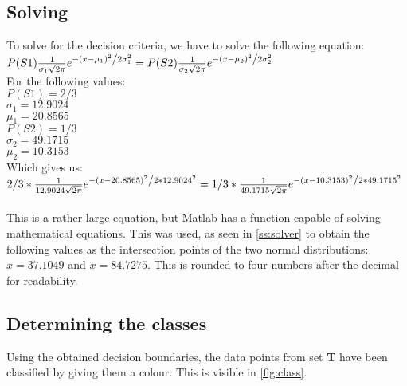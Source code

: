 \documentclass[10pt,a4paper]{article}
\begin{document}
\subsection{Solving}\label{ss:solving}
To solve for the decision criteria, we have to solve the following equation:\\
$
P(S1) \frac{1}{{\sigma_1 \sqrt {2\pi } }}e^{{{ - \left( {x - \mu_1 } \right)^2 } \mathord{\left/ {\vphantom {{ - \left( {x - \mu_1 } \right)^2 } {2\sigma_1 ^2 }}} \right. \kern-\nulldelimiterspace} {2\sigma_1 ^2 }}} = P(S2) \frac{1}{{\sigma_2 \sqrt {2\pi } }}e^{{{ - \left( {x - \mu_2 } \right)^2 } \mathord{\left/ {\vphantom {{ - \left( {x - \mu_2 } \right)^2 } {2\sigma_2 ^2 }}} \right. \kern-\nulldelimiterspace} {2\sigma_2 ^2 }}}
$\\
For the following values:\\
$P(S1) = 2/3$\\
$\sigma_1 = 12.9024$\\
$\mu_1 = 20.8565$\\
$P(S2) = 1/3$\\
$\sigma_2 = 49.1715$\\
$\mu_2 = 10.3153$\\
Which gives us:\\
$
2/3 * \frac{1}{{12.9024 \sqrt {2\pi } }}e^{{{ - \left( {x - 20.8565 } \right)^2 } \mathord{\left/ {\vphantom {{ - \left( {x - 20.85651 } \right)^2 } {2 * 12.9024 ^2 }}} \right. \kern-\nulldelimiterspace} {2 * 12.9024 ^2 }}} = 1/3 * \frac{1}{{49.1715 \sqrt {2\pi } }}e^{{{ - \left( {x - 10.3153 } \right)^2 } \mathord{\left/ {\vphantom {{ - \left( {x - 10.3153 } \right)^2 } {2 * 49.1715 ^2 }}} \right. \kern-\nulldelimiterspace} {2 * 49.1715 ^2 }}}
$\\
\\
This is a rather large equation, but Matlab has a function capable of solving mathematical equations. This was used, as seen in \autoref{ss:solver} to obtain the following values as the intersection points of the two normal distributions: $ x = 37.1049$ and $x = 84.7275$. This is rounded to four numbers after the decimal for readability.

\subsection{Determining the classes}
Using the obtained decision boundaries, the data points from set \textbf{T} have been classified by giving them a colour. This is visible in \autoref{fig:class}.
\end{document}
